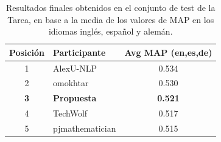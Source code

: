 \begin{table}[ht!]
    \centering
    \begin{tabular}{clc }
        \hline
        \textbf{Posición} & \textbf{Participante} & \textbf{Avg MAP (en,es,de)} \\ \hline
        1                 & AlexU-NLP             & 0.534                       \\ 
        2                 & omokhtar              & 0.530                       \\
        \textbf{3}        & \textbf{Propuesta}    & \textbf{0.521}              \\
        4                 & TechWolf              & 0.517                       \\ 
        5                 & pjmathematician       & 0.515                       \\ \hline
    \end{tabular}
    \caption{Resultados finales obtenidos en el conjunto de test de la \gls{Tarea}, en base a la media de los valores de MAP en los idiomas inglés, español y alemán.}
    \label{tab:final_results_avg}
\end{table}

